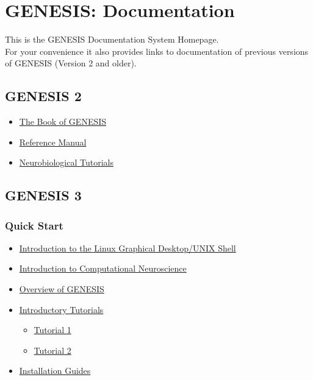 \documentclass[12pt]{article}
\begin{document}
\section*{GENESIS: Documentation}

This is the GENESIS Documentation System Homepage.\\
For your convenience it also provides links to documentation of previous versions of GENESIS (Version 2 and older).

\subsection*{GENESIS 2}

\begin{itemize}
 
 \item \href{http://www.genesis-sim.org/documentation}{The Book of GENESIS}

 \item \href{http://www.genesis-sim.org/GENESIS/Hyperdoc/Manual.html}{Reference Manual}

\item \href{http://www.genesis-sim.org/GENESIS/Tutorials_summary.html}{Neurobiological Tutorials}

\end{itemize}

\subsection*{GENESIS 3}

\subsubsection*{Quick Start}

\begin{itemize}

\item \href{../unix-linux/unix-linux.tex}{Introduction to the Linux Graphical Desktop/UNIX Shell}

\item \href{../compneurosci-1/compneurosci-1.tex}{Introduction to Computational Neuroscience}

\item \href{../genesis-overview/genesis-overview.tex}{Overview of GENESIS}

\item \href{../contents-level1/contents-level1.tex}{Introductory Tutorials}
  \begin{itemize}
  \item \href{../tutorial1/tutorial1.tex}{Tutorial 1}

  \item \href{../tutorial2/tutorial2.tex}{Tutorial 2}
  \end{itemize}

\item \href{../installation/installation.tex}{Installation Guides}

\end{itemize}
\end{document}
